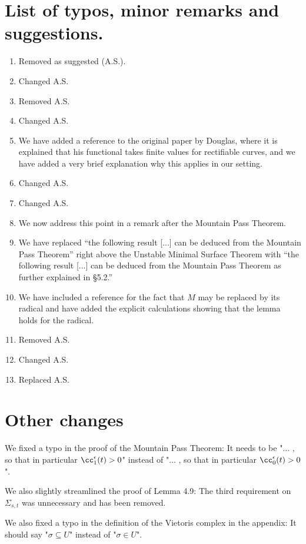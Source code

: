 \documentclass{article}
\begin{document}
	\section{List of typos, minor remarks and suggestions.}
	\begin{enumerate}
		\item Removed as suggested (A.S.).
		\item Changed A.S.
		\item Removed A.S.
		\item Changed A.S.
		\item We have added a reference to the original paper by Douglas, where it is explained that his functional takes finite values for rectifiable curves, and we have added a very brief explanation why this applies in our setting.
		\item Changed A.S.
		\item Changed A.S.
		\item We now address this point in a remark after the Mountain Pass Theorem.
		\item We have replaced ``the following result [...] can be deduced from the Mountain Pass Theorem'' right above the Unstable Minimal Surface Theorem with ``the following result [...] can be deduced from the Mountain Pass Theorem as further explained in \S 5.2.''
		\item We have included a reference for the fact that $M$ may be replaced by its radical and have added the explicit calculations showing that the lemma holds for the radical.
		\item Removed A.S.
		\item Changed A.S.
		\item Replaced A.S.
	\end{enumerate}
	
	\section{Other changes}
	We fixed a typo in the proof of the Mountain Pass Theorem: It needs to be "... , so that in particular $\cc_{1}^{\epsilon}(t) > 0$" instead of "... , so that in particular $\cc_{0}^{\epsilon}(t) > 0$".
	
	We also slightly streamlined the proof of Lemma 4.9: The third requirement on $\Sigma_{s,t}$ was unnecessary and has been removed.
	
	We also fixed a typo in the definition of the Vietoris complex in the appendix: It should say "$\sigma \subseteq U$" instead of "$\sigma \in U$".
\end{document}
